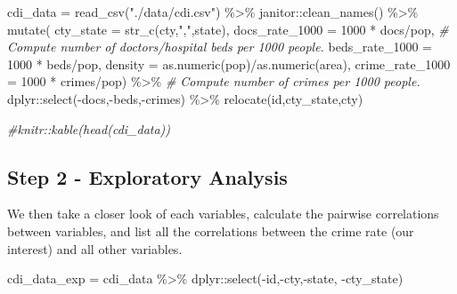 \documentclass[
  11pt,
]{article}
\newenvironment{Shaded}{\begin{snugshade}}{\end{snugshade}}
\newcommand{\AttributeTok}[1]{\textcolor[rgb]{0.77,0.63,0.00}{#1}}
\newcommand{\CommentTok}[1]{\textcolor[rgb]{0.56,0.35,0.01}{\textit{#1}}}
\newcommand{\DecValTok}[1]{\textcolor[rgb]{0.00,0.00,0.81}{#1}}
\newcommand{\FunctionTok}[1]{\textcolor[rgb]{0.00,0.00,0.00}{#1}}
\newcommand{\NormalTok}[1]{#1}
\newcommand{\OtherTok}[1]{\textcolor[rgb]{0.56,0.35,0.01}{#1}}
\newcommand{\SpecialCharTok}[1]{\textcolor[rgb]{0.00,0.00,0.00}{#1}}
\newcommand{\StringTok}[1]{\textcolor[rgb]{0.31,0.60,0.02}{#1}}
\begin{document}
\begin{Shaded}
\begin{Highlighting}[]
\NormalTok{cdi\_data }\OtherTok{=} \FunctionTok{read\_csv}\NormalTok{(}\StringTok{"./data/cdi.csv"}\NormalTok{) }\SpecialCharTok{\%\textgreater{}\%}
\NormalTok{  janitor}\SpecialCharTok{::}\FunctionTok{clean\_names}\NormalTok{() }\SpecialCharTok{\%\textgreater{}\%}
  \FunctionTok{mutate}\NormalTok{(}
    \AttributeTok{cty\_state =} \FunctionTok{str\_c}\NormalTok{(cty,}\StringTok{","}\NormalTok{,state),}
    \AttributeTok{docs\_rate\_1000 =} \DecValTok{1000} \SpecialCharTok{*}\NormalTok{ docs}\SpecialCharTok{/}\NormalTok{pop, }
    \CommentTok{\# Compute number of doctors/hospital beds per 1000 people.}
    \AttributeTok{beds\_rate\_1000 =} \DecValTok{1000} \SpecialCharTok{*}\NormalTok{ beds}\SpecialCharTok{/}\NormalTok{pop,}
    \AttributeTok{density =} \FunctionTok{as.numeric}\NormalTok{(pop)}\SpecialCharTok{/}\FunctionTok{as.numeric}\NormalTok{(area),}
    \AttributeTok{crime\_rate\_1000 =} \DecValTok{1000} \SpecialCharTok{*}\NormalTok{ crimes}\SpecialCharTok{/}\NormalTok{pop) }\SpecialCharTok{\%\textgreater{}\%} 
  \CommentTok{\# Compute number of crimes per 1000 people. }
\NormalTok{  dplyr}\SpecialCharTok{::}\FunctionTok{select}\NormalTok{(}\SpecialCharTok{{-}}\NormalTok{docs,}\SpecialCharTok{{-}}\NormalTok{beds,}\SpecialCharTok{{-}}\NormalTok{crimes) }\SpecialCharTok{\%\textgreater{}\%}
  \FunctionTok{relocate}\NormalTok{(id,cty\_state,cty)}

\CommentTok{\#knitr::kable(head(cdi\_data))}
\end{Highlighting}
\end{Shaded}

\hypertarget{step-2---exploratory-analysis}{%
\subsection{Step 2 - Exploratory
Analysis}\label{step-2---exploratory-analysis}}

We then take a closer look of each variables, calculate the pairwise
correlations between variables, and list all the correlations between
the crime rate (our interest) and all other variables.

\begin{Shaded}
\begin{Highlighting}[]
\NormalTok{cdi\_data\_exp }\OtherTok{=}\NormalTok{ cdi\_data }\SpecialCharTok{\%\textgreater{}\%}
\NormalTok{  dplyr}\SpecialCharTok{::}\FunctionTok{select}\NormalTok{(}\SpecialCharTok{{-}}\NormalTok{id,}\SpecialCharTok{{-}}\NormalTok{cty,}\SpecialCharTok{{-}}\NormalTok{state, }\SpecialCharTok{{-}}\NormalTok{cty\_state) }
\end{Highlighting}
\end{Shaded}
\end{document}
